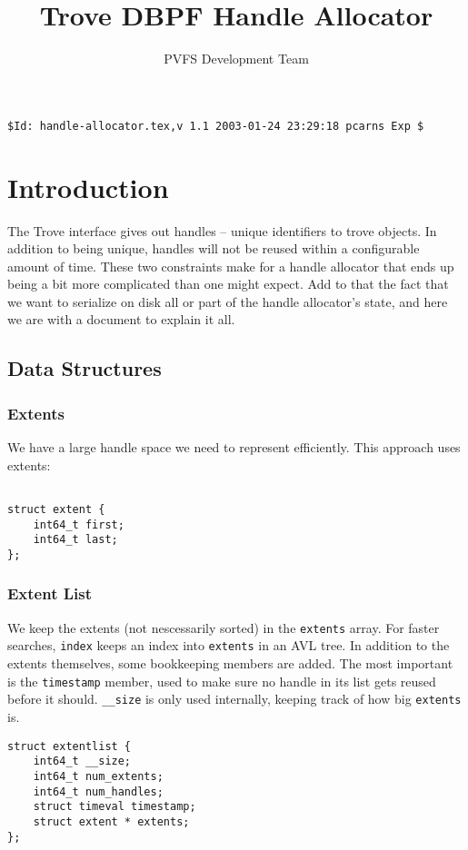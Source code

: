 \documentclass[10pt]{article} %
\title{Trove DBPF Handle Allocator }
\author{PVFS Development Team}
\begin{document}
\maketitle
\begin{verbatim}$Id: handle-allocator.tex,v 1.1 2003-01-24 23:29:18 pcarns Exp $\end{verbatim}

\section{Introduction}

The Trove interface gives out handles -- unique identifiers to trove
objects.  In addition to being unique, handles will not be reused within
a configurable amount of time.  These two constraints make for a handle
allocator that ends up being a bit more complicated than one might
expect.  Add to that the fact that we want to serialize on disk all or
part of the handle allocator's state, and here we are with a document to
explain it all.

\subsection{Data Structures}
\subsubsection{Extents}
We have a large handle space we need to represent efficiently.  This
approach uses extents:
\begin{verbatim}

struct extent {
	int64_t first;
	int64_t last;
};

\end{verbatim}

\subsubsection{Extent List}
We keep the extents (not nescessarily sorted) in the \texttt{extents}
array.  For faster searches, \texttt{index} keeps an index into
\texttt{extents} in an AVL tree. 
In addition
to the extents themselves, some bookkeeping members are added.  The most
important is the \texttt{timestamp} member, used to make sure no handle in
its list gets reused before it should.  \texttt{\_\_size} is only used
internally, keeping track of how big \texttt{extents} is.  

\begin{verbatim}
struct extentlist {
	int64_t __size;
	int64_t num_extents;
	int64_t num_handles;
	struct timeval timestamp;
	struct extent * extents;
};
\end{verbatim}
\end{document}
